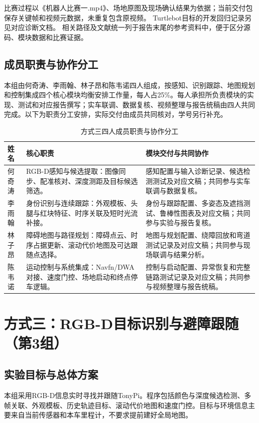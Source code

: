 比赛过程以《机器人比赛一.mp4》、场地原图及现场确认结果为依据；当前交付包保存关键帧和视频元数据，未重复包含原视频。\cite{f3-race} Turtlebot目标的开发回归记录另见对应诊断文档。\cite{f3-turtlebot} 相关路径及文献统一列于报告末尾的参考资料中，便于区分源码、模块数据和比赛证据。



\FloatBarrier


\subsection{成员职责与协作分工}

本组由何奇涛、李雨翰、林子昂和陈韦诺四人组成，按感知、识别跟踪、地图规划和控制集成四个核心模块均衡安排工作量，每人占25\%。每人承担所负责模块的实现、测试和对应报告撰写；实车联调、数据复核、视频整理与报告统稿由四人共同完成。以下为职责分工安排，实际交付由成员共同核对，学号另行补充。
\begin{table}[!htbp]\centering\small
\caption{方式三四人成员职责与协作分工}\label{tab:f3-members}
\begin{tabularx}{\linewidth}{p{18mm}YY}\toprule
姓名 & 核心职责 & 模块交付与共同协作\\\midrule
何奇涛 & RGB-D感知与候选提取：图像同步、配准核对、深度测距及目标候选筛选。 & 感知配置与输入诊断记录、候选检测测试及对应文稿；共同参与实车联调与数据复核。\\
李雨翰 & 身份识别与连续跟踪：外观模板、头腿与红块特征、时序关联及短时光流补接。 & 身份与跟踪配置、多姿态及遮挡测试、鲁棒性图表及对应文稿；共同参与实验与报告复核。\\
林子昂 & 障碍地图与路径规划：障碍点云、时序占据更新、滚动代价地图及可达跟随点选择。 & 地图与规划配置、绕障回放和弯道测试记录及对应文稿；共同参与现场联调与结果分析。\\
陈韦诺 & 运动控制与系统集成：Navfn/DWA对接、速度门控、场地启动和终点停车逻辑。 & 控制与启动配置、异常恢复和完整链路测试记录及对应文稿；共同参与视频整理与报告统稿。\\\bottomrule
\end{tabularx}\end{table}

\FloatBarrier

\endgroup
\section{方式三：RGB-D目标识别与避障跟随（第3组）}
\subsection{实验目标与总体方案}
本组采用RGB-D信息实时寻找并跟随TonyPi。程序包括颜色与深度候选检测、多帧关联、外观模板、历史轨迹目标、滚动代价地图和速度门控。目标与环境信息主要来自当前传感器和本车里程计，不要求提前建好全局地图。\cite{follow3}

